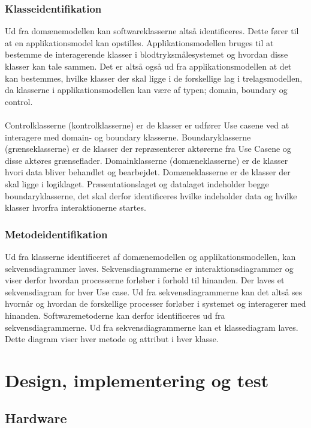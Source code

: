 \subsubsection{Klasseidentifikation}
Ud fra domænemodellen kan softwareklasserne altså identificeres. Dette fører til at en applikationsmodel kan opstilles. Applikationsmodellen bruges til at bestemme de interagerende klasser i blodtryksmålesystemet og hvordan disse klasser kan tale sammen. Det er altså også ud fra applikationsmodellen at det kan bestemmes, hvilke klasser der skal ligge i de forskellige lag i trelagsmodellen, da klasserne i applikationsmodellen kan være af typen; domain, boundary og control.\\\\ Controlklasserne (kontrolklasserne) er de klasser er udfører Use casene ved at interagere med domain- og boundary klasserne. Boundaryklasserne (grænseklasserne) er de klasser der repræsenterer aktørerne fra Use Casene og disse aktøres grænseflader. Domainklasserne (domæneklasserne) er de klasser hvori data bliver behandlet og bearbejdet. Domæneklasserne er de klasser der skal ligge i logiklaget. Præsentationslaget og datalaget indeholder begge boundaryklasserne, det skal derfor identificeres hvilke indeholder data og hvilke klasser hvorfra interaktionerne startes.
\subsubsection{Metodeidentifikation}
Ud fra klasserne identificeret af domænemodellen og applikationsmodellen, kan sekvensdiagrammer laves. Sekvensdiagrammerne er interaktionsdiagrammer og viser derfor hvordan processerne forløber i forhold til hinanden. Der laves et sekvensdiagram for hver Use case. Ud fra sekvensdiagrammerne kan det altså ses hvornår og hvordan de forskellige processer forløber i systemet og interagerer med hinanden. Softwaremetoderne kan derfor identificeres ud fra sekvensdiagrammerne. Ud fra sekvensdiagrammerne kan et klassediagram laves. Dette diagram viser hver metode og attribut i hver klasse.
\section{Design, implementering og test}
\subsection{Hardware}
